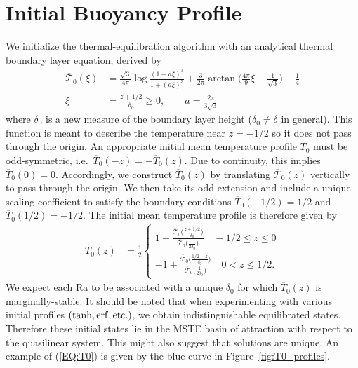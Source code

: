 \documentclass[reprint,amsmath,amssymb,aps,nofootinbib]{revtex4-1}
\newcommand\Ra{\mathrm{Ra}}
\newcommand{\eq}[1]{(\ref{#1})}
\begin{document}
\section{Initial Buoyancy Profile} \label{sec:initial_profile}
We initialize the thermal-equilibration algorithm with an analytical thermal boundary layer equation, derived by \cite{Shishkina} 
\begin{align}
    \overline{\mathcal{T}}_0(\xi) &= \frac{\sqrt{3}}{4\pi} \log \frac{(1 + a\xi)^3}{1 + (a\xi)^3} + \frac{3}{2\pi} \arctan \Big( \frac{4\pi}{9}\xi - \frac{1}{\sqrt{3}} \Big) + \frac{1}{4} \nonumber \\
    \xi &= \frac{z + 1/2}{\delta_0} \geq 0, \qquad a = \frac{2\pi}{3\sqrt{3}}\label{EQ:T0}
\end{align}
where $\delta_0$ is a new measure of the boundary layer height ($\delta_0 \neq \delta$ in general). 
This function is meant to describe the temperature near $z = -1/2$ so it does not pass through the origin.
An appropriate initial mean temperature profile $\overline{T}_0$ must be odd-symmetric, i.e.~$\overline{T}_0(-z) = -\overline{T}_0(z)$.
Due to continuity, this implies $\overline{T}_0(0) = 0$.
Accordingly, we construct $\overline{T}_0(z)$ by translating $\overline{\mathcal{T}}_0(z)$ vertically to pass through the origin.
We then take its odd-extension and include a unique scaling coefficient to satisfy the boundary conditions $\overline{T}_0(-1/2) = 1/2$ and $\overline{T}_0(1/2) = -1/2$.
The initial mean temperature profile is therefore given by
\begin{align*}
    \overline{T}_0(z) &= \frac{1}{2} \begin{cases}
        1 - \frac{\overline{\mathcal{T}}_0\big(\frac{z + 1/2}{\delta_0}\big)}{\overline{\mathcal{T}}_0\big(\frac{1}{2\delta_0}\big)} \quad -1/2 \leq z \leq 0 \\[0.5cm]
        -1 + \frac{\overline{\mathcal{T}}_0\big(\frac{1/2 - z}{\delta_0}\big)}{\overline{\mathcal{T}}_0\big(\frac{1}{2\delta_0}\big)} \quad 0 < z \leq 1/2.
    \end{cases}
\end{align*} 
 We expect each $\Ra$ to be associated with a unique $\delta_0$ for which $\overline{T}_0(z)$ is marginally-stable. 
It should be noted that when experimenting with various initial profiles $(\tanh, \rm{erf}, \rm{etc.})$, we obtain indistinguishable equilibrated states.
Therefore these initial states lie in the MSTE basin of attraction with respect to the quasilinear system.
This might also suggest that solutions are unique. 
An example of \eq{EQ:T0} is given by the blue curve in Figure~\ref{fig:T0_profiles}.
\end{document}

